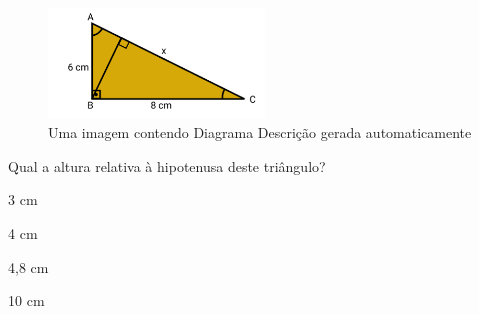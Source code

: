 \begin{escolha}
\begin{boxmedio}
\begin{boxmedio}
{\begin{boxpeq}
\begin{boxpeq}
{\begin{boxpeq}
\begin{boxmedio}
\begin{boxmedio}
\begin{boxpeq}
\begin{boxmedio}
\begin{boxpeq}
\begin{boxpeq}
\begin{boxpeq}
\begin{boxpeq}
\begin{boxmedio}
{\begin{boxmedio}
\begin{boxmedio}
\begin{boxpeq}
\begin{boxmedio}
\begin{boxpeq}
\begin{boxpeq}
\begin{boxpeq}
\begin{escolha}
{\begin{boxmedio}
\begin{boxpeq}
\begin{boxpeq}
\begin{boxpeq}
\begin{boxpeq}
\begin{boxpeq}
\begin{boxmedio}
\begin{boxpeq}
\begin{boxpeq}
\begin{boxpeq}
{\begin{boxpeq}
\begin{boxmedio}
\begin{boxpeq}
\begin{boxpeq}
\begin{boxpeq}
{\begin{boxpeq}
\begin{boxmedio}
{\begin{boxpeq}
\begin{boxpeq}
\begin{boxmedio}
\begin{boxmedio}
\begin{boxpeq}
\begin{boxpeq}
{\begin{boxpeq}
\begin{boxpeq}
\begin{boxpeq}
\begin{boxpeq}
\begin{boxpeq}
\begin{escolha}
\begin{escolha}
{\begin{boxmedio}
\begin{boxpeq}
\begin{q°}
\begin{boxmedio}
\begin{boxpeq}
\begin{boxpeq}
\begin{boxmedio}
\begin{boxmedio}
\begin{boxmedio}
\begin{boxmedio}
{\begin{escolha}
\begin{escolha}
\begin{escolha}
\begin{escolha}
\begin{figure}
\centering
\includegraphics[width=2.26562in,height=1.15183in]{./_SAEB_9_MAT/media/image260.png}
\caption{Uma imagem contendo Diagrama Descrição gerada automaticamente}
\end{figure}

Qual a altura relativa à hipotenusa deste triângulo?

\begin{escolha}

  \item 3 cm

  \item 4 cm

  \item 4,8 cm

  \item 10 cm

\begin{escolha}


\end{escolha}
\end{escolha}
\end{escolha}
\end{escolha}
\end{escolha}
\end{escolha}}
\end{boxmedio}
\end{boxmedio}
\end{boxmedio}
\end{boxmedio}
\end{boxpeq}
\end{boxpeq}
\end{boxmedio}
\end{q°}
\end{boxpeq}
\end{boxmedio}}
\end{escolha}
\end{escolha}
\end{boxpeq}
\end{boxpeq}
\end{boxpeq}
\end{boxpeq}
\end{boxpeq}}
\end{boxpeq}
\end{boxpeq}
\end{boxmedio}
\end{boxmedio}
\end{boxpeq}
\end{boxpeq}}
\end{boxmedio}
\end{boxpeq}}
\end{boxpeq}
\end{boxpeq}
\end{boxpeq}
\end{boxmedio}
\end{boxpeq}}
\end{boxpeq}
\end{boxpeq}
\end{boxpeq}
\end{boxmedio}
\end{boxpeq}
\end{boxpeq}
\end{boxpeq}
\end{boxpeq}
\end{boxpeq}
\end{boxmedio}}
\end{escolha}
\end{boxpeq}
\end{boxpeq}
\end{boxpeq}
\end{boxmedio}
\end{boxpeq}
\end{boxmedio}
\end{boxmedio}}
\end{boxmedio}
\end{boxpeq}
\end{boxpeq}
\end{boxpeq}
\end{boxpeq}
\end{boxmedio}
\end{boxpeq}
\end{boxmedio}
\end{boxmedio}
\end{boxpeq}}
\end{boxpeq}
\end{boxpeq}}
\end{boxmedio}
\end{boxmedio}
\end{escolha}
